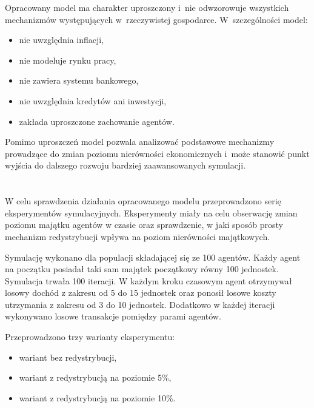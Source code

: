 \documentclass[polish]{projectreport}
\begin{document}
Opracowany model ma charakter uproszczony i~nie odwzorowuje wszystkich mechanizm\'ow
wyst\k{e}puj\k{a}cych w~rzeczywistej gospodarce. W~szczeg\'olno\'sci model:
\begin{itemize}
  \item nie uwzgl\k{e}dnia inflacji,
  \item nie modeluje rynku pracy,
  \item nie zawiera systemu bankowego,
  \item nie uwzgl\k{e}dnia kredyt\'ow ani inwestycji,
  \item zak\l{}ada uproszczone zachowanie agent\'ow.
\end{itemize}

Pomimo uproszcze\'n model pozwala analizowa\'{c} podstawowe mechanizmy prowadz\k{a}ce do
zmian poziomu nier\'owno\'sci ekonomicznych i~mo\.{z}e stanowi\'{c} punkt wyj\'scia do dalszego
rozwoju bardziej zaawansowanych symulacji.

\section{\SectionTitleExperiments}
\label{sec:experiments}

W celu sprawdzenia dzia{\l}ania opracowanego modelu przeprowadzono seri{\k e}
eksperymentów symulacyjnych. Eksperymenty mia{\l}y na celu obserwacj{\k e} zmian
poziomu maj{\k a}tku agentów w czasie oraz sprawdzenie, w jaki sposób prosty
mechanizm redystrybucji wp{\l}ywa na poziom nierówno{\'s}ci maj{\k a}tkowych.

Symulacj{\k e} wykonano dla populacji sk{\l}adaj{\k a}cej si{\k e} ze 100 agentów.
Ka{\.z}dy agent na pocz{\k a}tku posiada{\l} taki sam maj{\k a}tek pocz{\k a}tkowy równy
100 jednostek. Symulacja trwa{\l}a 100 iteracji. W ka{\.z}dym kroku czasowym agent
otrzymywa{\l} losowy dochód z zakresu od 5 do 15 jednostek oraz ponosi{\l} losowe
koszty utrzymania z zakresu od 3 do 10 jednostek. Dodatkowo w ka{\.z}dej iteracji
wykonywano losowe transakcje pomi{\k e}dzy parami agentów.

Przeprowadzono trzy warianty eksperymentu:
\begin{itemize}
    \item wariant bez redystrybucji,
    \item wariant z redystrybucj{\k a} na poziomie 5\%,
    \item wariant z redystrybucj{\k a} na poziomie 10\%.
\end{itemize}
\end{document}
